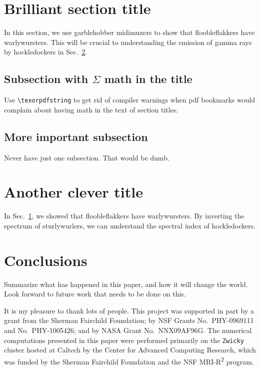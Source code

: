 \documentclass[reprint, aps, prd, letterpaper, noshowpacs, amsmath, %
amssymb, amsfonts, nofootinbib, floatfix, superscriptaddress, %
twoside]{revtex4-1}
\begin{document}
\section{Brilliant section title}
\label{sec:BrilliantSection}
In this section, we use garblehobber midimuxers to show that
floobleflakkers have warlywursters.  This will be crucial to
understanding the emission of gamma rays by hockledockers in
Sec.~\ref{sec:AnotherCleverOne}.

\subsection{Subsection with \texorpdfstring{$\Sigma$}{Sigma}
  math in the title}
\label{sec:ImportantSubsection}

Use \verb|\texorpdfstring| to get rid of compiler warnings when pdf
bookmarks would complain about having math in the text of section
titles.

\subsection{More important subsection}
\label{sec:MoreImportantSubsection}
Never have just one subsection.  That would be dumb.


\section{Another clever title}
\label{sec:AnotherCleverOne}
In Sec.~\ref{sec:BrilliantSection}, we showed that floobleflakkers
have warlywursters.  By inverting the spectrum of sturlywurlers, we
can understand the spectral index of hockledockers.


\section{Conclusions}
\label{sec:Conclusions}
Summarize what has happened in this paper, and how it will change the
world.  Look forward to future work that needs to be done on this.


\begin{acknowledgments}
  It is my pleasure to thank lots of people.  This project was
  supported in part by a grant from the Sherman Fairchild Foundation;
  by NSF Grants No.\ PHY-0969111 and No.\ PHY-1005426; and by NASA
  Grant No.\ NNX09AF96G. The numerical computations presented in this
  paper were performed primarily on the \texttt{Zwicky} cluster hosted
  at Caltech by the Center for Advanced Computing Research, which was
  funded by the Sherman Fairchild Foundation and the NSF
  MRI-R\textsuperscript{2} program.
\end{acknowledgments}
\end{document}
